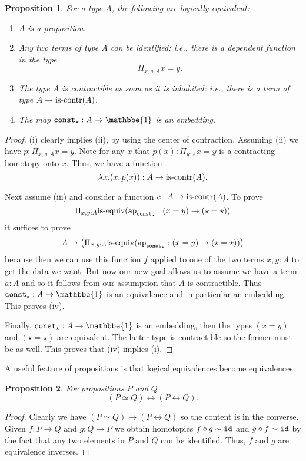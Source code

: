 \documentclass{amsart}
\theoremstyle{theorem}
\newtheorem*{prop}{Proposition}
\theoremstyle{definition}
\theoremstyle{remark}
\newcommand{\0}{\mathbbe{0}}
\newcommand{\1}{\mathbbe{1}}
\newcommand{\2}{\mathbbe{2}}
\newcommand{\3}{\mathbbe{3}}
\newcommand{\4}{\mathbbe{4}}
\newcommand{\term}[1]{{\textup{\texttt{#1}}}}
\newcommand{\type}[1]{{\textup{#1}}}
\newcommand{\id}{\term{id}}
\newcommand{\ap}{\term{ap}}
\newcommand{\iscontr}{\type{is-contr}}
\newcommand{\isequiv}{\type{is-equiv}}
\renewcommand{\iff}{\leftrightarrow}
\begin{document}
\begin{prop} For a type $A$, the following are logically equivalent:
\begin{enumerate}
\item $A$ is a proposition.
\item Any two terms of type $A$ can be identified: i.e., there is a dependent function in the type
\[ \Pi_{x,y:A} x=y.\]
\item The type $A$ is contractible as soon as it is inhabited: i.e., there is a term of type $A \to \iscontr(A)$.
\item The map $\term{const}_\star : A \to \1$ is an embedding. 
\end{enumerate}
\end{prop}
\begin{proof}
(i) clearly implies (ii), by using the center of contraction. Assuming (ii) we have $p : \Pi_{x,y:A} x= y$. Note for any $x$ that $p(x) : \Pi_{y :A} x=y$ is a contracting homotopy onto $x$. Thus, we have a function
\[ \lambda x. (x,p(x)) : A \to \iscontr(A).\]

Next assume (iii) and consider a function $c : A\to \iscontr(A)$. To prove 
\[ \Pi_{x,y :A} \isequiv (\ap_{\term{const}_\star} : (x=y) \to (\star = \star))\] it suffices to prove
\[ A \to \left(\Pi_{x,y :A} \isequiv (\ap_{\term{const}_\star} : (x=y) \to (\star = \star))\right)\]
because then we can use this function $f$ applied to one of the two terms $x,y : A$ to get the data we want. But now our new goal allows us to assume we have a term $a:A$ and so it follows from our assumption that $A$ is contractible. Thus $\term{const}_\star : A \to \1$ is an equivalence and in particular an embedding. This proves (iv).

Finally, $\term{const}_\star : A \to \1$ is an embedding, then the types $(x=y)$ and $(\star=\star)$ are equivalent. The latter type is contractible so the former must be as well. This proves that (iv) implies (i).
\end{proof}

A useful feature of propositions is that logical equivalences become equivalences:

\begin{prop} For propositions $P$ and $Q$
\[ (P \simeq Q) \iff (P \iff Q).\]
\end{prop}
\begin{proof}
Clearly we have $(P \simeq Q) \to (P \iff Q)$ so the content is in the converse. Given $f : P \to Q$ and $g : Q \to P$ we obtain homotopies $f \circ g \sim \id$ and $g \circ f \sim \id$ by the fact that any two elements in $P$ and $Q$ can be identified. Thus, $f$ and $g$ are equivalence inverses.
\end{proof}
\end{document}
